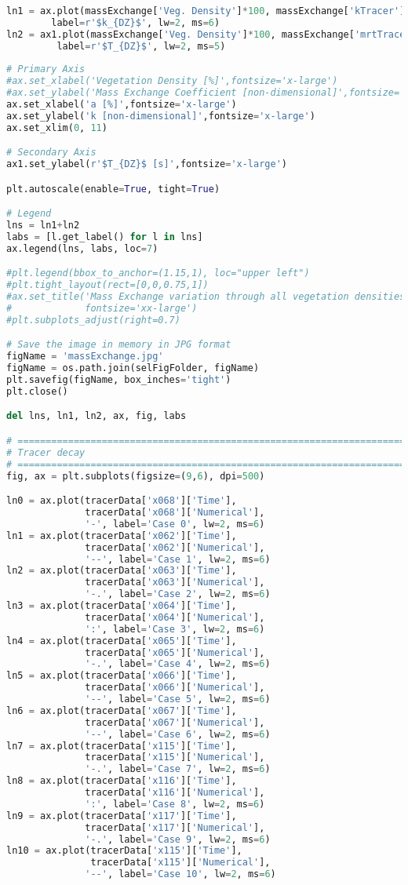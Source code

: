 \begin{lstlisting}[language=python]
ln1 = ax.plot(massExchange['Veg. Density']*100, massExchange['kTracer'], 'bo',
        label=r'$k_{DZ}$', lw=2, ms=6)
ln2 = ax1.plot(massExchange['Veg. Density']*100, massExchange['mrtTracer'], 'ks', 
         label=r'$T_{DZ}$', lw=2, ms=5)
    
# Primary Axis
#ax.set_xlabel('Vegetation Density [%]',fontsize='x-large')
#ax.set_ylabel('Mass Exchange Coefficient [non-dimensional]',fontsize='x-large')
ax.set_xlabel('a [%]',fontsize='x-large')
ax.set_ylabel('k [non-dimensional]',fontsize='x-large')
ax.set_xlim(0, 11)

# Secondary Axis
ax1.set_ylabel(r'$T_{DZ}$ [s]',fontsize='x-large')

plt.autoscale(enable=True, tight=True)

# Legend
lns = ln1+ln2
labs = [l.get_label() for l in lns]
ax.legend(lns, labs, loc=7)

#plt.legend(bbox_to_anchor=(1.15,1), loc="upper left")
#plt.tight_layout(rect=[0,0,0.75,1])
#ax.set_title('Mass Exchange variation through all vegetation densities',
#             fontsize='xx-large')
#plt.subplots_adjust(right=0.7)

# Save the image in memory in JPG format
figName = 'massExchange.jpg'
figName = os.path.join(selFigFolder, figName)
plt.savefig(figName, box_inches='tight')
plt.close()

del lns, ln1, ln2, ax, fig, labs

# =============================================================================
# Tracer decay
# =============================================================================
fig, ax = plt.subplots(figsize=(9,6), dpi=500)

ln0 = ax.plot(tracerData['x068']['Time'],
              tracerData['x068']['Numerical'],
              '-', label='Case 0', lw=2, ms=6)
ln1 = ax.plot(tracerData['x062']['Time'],
              tracerData['x062']['Numerical'],
              '--', label='Case 1', lw=2, ms=6)
ln2 = ax.plot(tracerData['x063']['Time'],
              tracerData['x063']['Numerical'],
              '-.', label='Case 2', lw=2, ms=6)
ln3 = ax.plot(tracerData['x064']['Time'],
              tracerData['x064']['Numerical'],
              ':', label='Case 3', lw=2, ms=6)
ln4 = ax.plot(tracerData['x065']['Time'],
              tracerData['x065']['Numerical'],
              '-.', label='Case 4', lw=2, ms=6)
ln5 = ax.plot(tracerData['x066']['Time'],
              tracerData['x066']['Numerical'],
              '--', label='Case 5', lw=2, ms=6)
ln6 = ax.plot(tracerData['x067']['Time'],
              tracerData['x067']['Numerical'],
              '--', label='Case 6', lw=2, ms=6)
ln7 = ax.plot(tracerData['x115']['Time'],
              tracerData['x115']['Numerical'],
              '-.', label='Case 7', lw=2, ms=6)
ln8 = ax.plot(tracerData['x116']['Time'],
              tracerData['x116']['Numerical'],
              ':', label='Case 8', lw=2, ms=6)
ln9 = ax.plot(tracerData['x117']['Time'],
              tracerData['x117']['Numerical'],
              '-.', label='Case 9', lw=2, ms=6)
ln10 = ax.plot(tracerData['x115']['Time'],
               tracerData['x115']['Numerical'],
              '--', label='Case 10', lw=2, ms=6)


\end{lstlisting}
